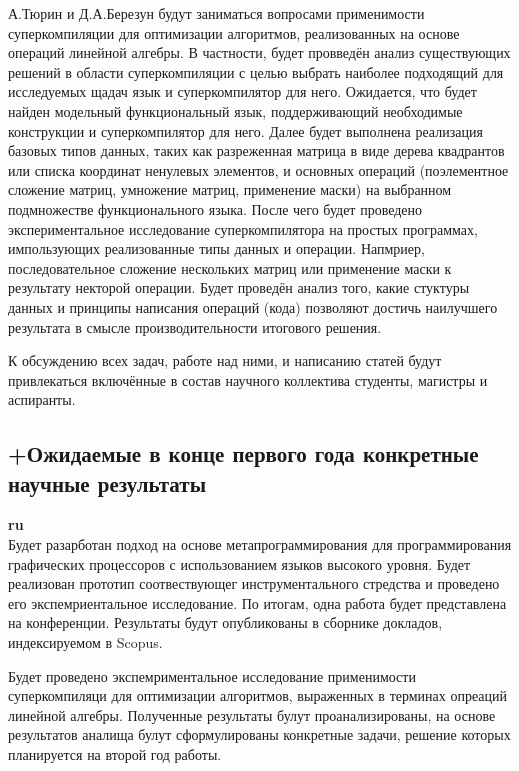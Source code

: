 \documentclass[12pt]{article}  %
\theoremstyle{remark}
\begin{document}
А.Тюрин и Д.А.Березун будут заниматься вопросами применимости суперкомпиляции для оптимизации алгоритмов, реализованных на основе операций линейной алгебры. В частности, будет провведён анализ существующих решений в области суперкомпиляции с целью выбрать наиболее подходящий для исследуемых щадач язык и суперкомпилятор для него. Ожидается, что будет найден модельный функциональный язык, поддерживающий необходимые конструкции и суперкомпилятор для него. Далее будет выполнена реализация базовых типов данных, таких как разреженная матрица в виде дерева квадрантов или списка координат ненулевых элементов, и основных операций (поэлементное сложение матриц, умножение матриц, применение маски) на выбранном подмножестве функционального языка.
После чего будет проведено экспериментальное исследование суперкомпилятора на простых программах, импользующих реализованные типы данных и операции. Напмриер, последовательное сложение нескольких матриц или применение маски к результату некторой операции. Будет проведён анализ того, какие стуктуры данных и принципы написания операций (кода) позволяют достичь наилучшего результата в смысле производительности итогового решения. 

К обсуждению всех задач, работе над ними, и написанию статей будут привлекаться включённые в состав научного коллектива студенты, магистры и аспиранты.

\subsection{+Ожидаемые в конце первого года конкретные научные результаты}

\textbf{ru}\\

Будет разарботан подход на основе метапрограммирования для программирования графических процессоров с использованием языков высокого уровня. Будет реализован прототип соотвествующег инструментального стредства и проведено его экспемриентальное исследование. По итогам, одна работа будет представлена на конференции. Результаты будут опубликованы в сборнике докладов, индексируемом в Scopus.

Будет проведено экспемриментальное исследование применимости суперкомпиляци для оптимизации алгоритмов, выраженных в терминах опреаций линейной алгебры. Полученные результаты булут проанализированы, на основе результатов аналища булут сформулированы конкретные задачи, решение которых планируется на второй год работы.
\end{document}

